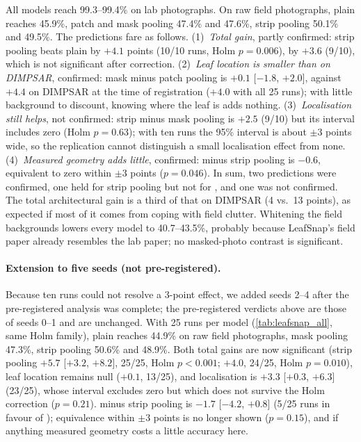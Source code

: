 All models reach 99.3--99.4\% on lab photographs. On raw field photographs, plain reaches 45.9\%,
patch and mask pooling 47.4\% and 47.6\%, strip pooling 50.1\% and \SVA{} 49.5\%. The predictions fare
as follows. (1)~\emph{Total gain}, partly confirmed: strip pooling beats plain by $+4.1$ points (10/10
runs, Holm $p=0.006$), \SVA{} by $+3.6$ (9/10), which is not significant after correction. (2)~\emph{Leaf
location is smaller than on DIMPSAR}, confirmed: mask minus patch pooling is $+0.1$ [$-1.8$, $+2.0$],
against $+4.4$ on DIMPSAR at the time of registration ($+4.0$ with all 25 runs); with little background
to discount, knowing where the leaf is adds nothing. (3)~\emph{Localisation still helps}, not
confirmed: strip minus mask pooling is $+2.5$ (9/10) but its interval includes zero (Holm $p=0.63$);
with ten runs the 95\% interval is about $\pm3$ points wide, so the replication cannot distinguish a
small localisation effect from none.
(4)~\emph{Measured geometry adds little}, confirmed: \SVA{} minus strip pooling is $-0.6$, equivalent to
zero within $\pm3$ points ($p=0.046$). In sum, two predictions were confirmed, one held for strip pooling but not for \SVA{}, and one was not confirmed. The total architectural gain is a third of that on DIMPSAR
(4 vs.\ 13 points), as expected if most of it comes from coping with field clutter. Whitening the field
backgrounds lowers every model to 40.7--43.5\%, probably because LeafSnap's field paper already resembles the lab
paper; no masked-photo contrast is significant.

\paragraph{Extension to five seeds (not pre-registered).} Because ten runs could not resolve a
3-point effect, we added seeds 2--4 after the pre-registered analysis was complete; the
pre-registered verdicts above are those of seeds 0--1 and are unchanged. With 25 runs per model
(\cref{tab:leafsnap_all}, same Holm family), plain reaches 44.9\% on raw field photographs, mask pooling
47.3\%, strip pooling 50.6\% and \SVA{} 48.9\%. Both total gains are now significant (strip pooling
$+5.7$ [$+3.2$, $+8.2$], 25/25, Holm $p<0.001$; \SVA{} $+4.0$, 24/25, Holm $p=0.010$), leaf location
remains null ($+0.1$, 13/25), and localisation is $+3.3$ [$+0.3$, $+6.3$] (23/25), whose interval
excludes zero but which does not survive the Holm correction ($p=0.21$). \SVA{} minus strip pooling
is $-1.7$ [$-4.2$, $+0.8$] (5/25 runs in favour of \SVA{}); equivalence within $\pm3$ points is
no longer shown ($p=0.15$), and if anything measured geometry costs a little accuracy here.

